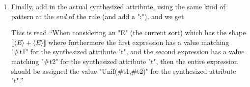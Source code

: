 \documentclass[11pt]{article} %
\begin{document}
\begin{enumerate}
\item Finally, add in the actual synthesized attribute, using the same kind of pattern at the
  \emph{end} of the rule (and add a ";"), and we get
  This is read ``When considering an "E" (the current sort) which has the shape
  $⟦⟨E⟩+⟨E⟩⟧$ where furthermore the first expression has a value matching "#t1" for the
  synthesized attribute "t", and the second expression has a value matching "#t2" for the
  synthesized attribute "t", then the entire expression should be assigned the value "Unif(#t1,#t2)"
  for the synthesized attribute "t".''

\end{enumerate}
\end{document}
